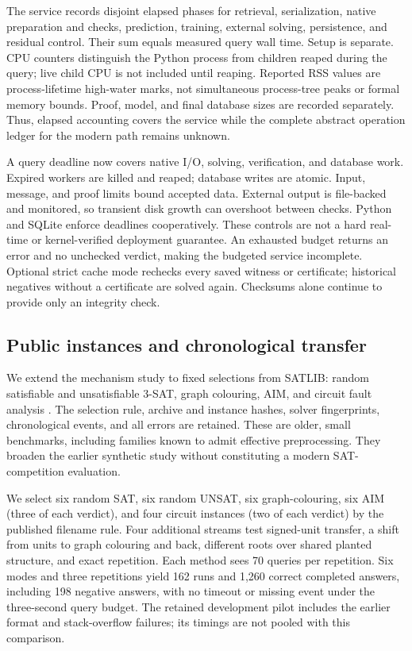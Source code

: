 \documentclass[11pt,a4paper]{article}
\numberwithin{equation}{section}
\theoremstyle{plain}
\theoremstyle{definition}
\theoremstyle{remark}
\begin{document}
The service records disjoint elapsed phases for retrieval, serialization, native preparation and checks, prediction, training, external solving, persistence, and residual control. Their sum equals measured query wall time. Setup is separate. CPU counters distinguish the Python process from children reaped during the query; live child CPU is not included until reaping. Reported RSS values are process-lifetime high-water marks, not simultaneous process-tree peaks or formal memory bounds. Proof, model, and final database sizes are recorded separately. Thus, elapsed accounting covers the service while the complete abstract operation ledger for the modern path remains unknown.

A query deadline now covers native I/O, solving, verification, and database work. Expired workers are killed and reaped; database writes are atomic. Input, message, and proof limits bound accepted data. External output is file-backed and monitored, so transient disk growth can overshoot between checks. Python and SQLite enforce deadlines cooperatively. These controls are not a hard real-time or kernel-verified deployment guarantee. An exhausted budget returns an error and no unchecked verdict, making the budgeted service incomplete. Optional strict cache mode rechecks every saved witness or certificate; historical negatives without a certificate are solved again. Checksums alone continue to provide only an integrity check.

\subsection{Public instances and chronological transfer}
\label{sec:expanded-study}

We extend the mechanism study to fixed selections from SATLIB: random satisfiable and unsatisfiable 3-SAT, graph colouring, AIM, and circuit fault analysis \citep{satlib}. The selection rule, archive and instance hashes, solver fingerprints, chronological events, and all errors are retained. These are older, small benchmarks, including families known to admit effective preprocessing. They broaden the earlier synthetic study without constituting a modern SAT-competition evaluation.

We select six random SAT, six random UNSAT, six graph-colouring, six AIM (three of each verdict), and four circuit instances (two of each verdict) by the published filename rule. Four additional streams test signed-unit transfer, a shift from units to graph colouring and back, different roots over shared planted structure, and exact repetition. Each method sees 70 queries per repetition. Six modes and three repetitions yield 162 runs and 1,260 correct completed answers, including 198 negative answers, with no timeout or missing event under the three-second query budget. The retained development pilot includes the earlier format and stack-overflow failures; its timings are not pooled with this comparison.
\end{document}
